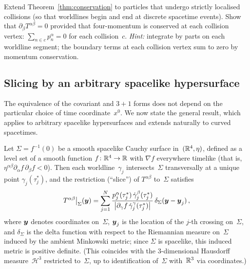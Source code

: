 \begin{exercise}\label{ex:conservation-collision}
  Extend Theorem~\ref{thm:conservation} to particles that undergo
  strictly localised collisions (so that worldlines begin and end
  at discrete spacetime events).  Show that $\partial_\beta
  T^{\alpha\beta} = 0$ provided that four-momentum is conserved
  at each collision vertex: $\sum_{n\in c} p_n^\alpha = 0$ for
  each collision~$c$.
  \emph{Hint:} integrate by parts on each worldline segment;
  the boundary terms at each collision vertex sum to zero by
  momentum conservation.
\end{exercise}

\subsection{Slicing by an arbitrary spacelike hypersurface}%
\label{sec:general-slicing}

The equivalence of the covariant and $3{+}1$ forms does not depend
on the particular choice of time coordinate~$x^0$.  We now state
the general result, which applies to arbitrary spacelike
hypersurfaces and extends naturally to curved spacetimes.

\begin{theorem}%
\label{thm:general-slicing}
  Let $\Sigma = f^{-1}(0)$ be a smooth spacelike Cauchy surface
  in~$(\mathbb{R}^{4},\eta)$, defined as a level set of a smooth function
  $f\colon\mathbb{R}^{4}\to\mathbb{R}$ with $\nabla f$ everywhere timelike
  (that is, $\eta^{\alpha\beta}\partial_\alpha f\,\partial_\beta f < 0$).
  Then each worldline~$\gamma_j$ intersects~$\Sigma$
  transversally at a unique point
  $\gamma_j(\tau_j^\ast)$, and the restriction (``slice'') of
  $T^{\alpha\beta}$ to~$\Sigma$ satisfies
  \begin{equation}\label{eq:general-slicing}
    T^{\alpha\beta}\big|_\Sigma(\boldsymbol{y})
      = \sum_{j=1}^{N}
        \frac{p_j^\alpha(\tau_j^\ast)\,
              \dot\gamma_j^\beta(\tau_j^\ast)}
             {\bigl|\partial_\gamma f\,
              \dot\gamma_j^\gamma(\tau_j^\ast)\bigr|}\,
        \delta_\Sigma(\boldsymbol{y} - \boldsymbol{y}_j)\,,
  \end{equation}
  where $\boldsymbol{y}$ denotes coordinates on~$\Sigma$, $\boldsymbol{y}_j$ is
  the location of the $j$-th crossing on~$\Sigma$, and
  $\delta_\Sigma$ is the delta function with respect to the
  Riemannian measure on~$\Sigma$ induced by the ambient Minkowski
  metric; since $\Sigma$ is spacelike, this induced metric is
  positive definite.  (This coincides with the $3$-dimensional
  Hausdorff measure~$\mathcal{H}^3$ restricted to~$\Sigma$, up
  to identification of~$\Sigma$ with~$\mathbb{R}^3$ via coordinates.)
\end{theorem}

